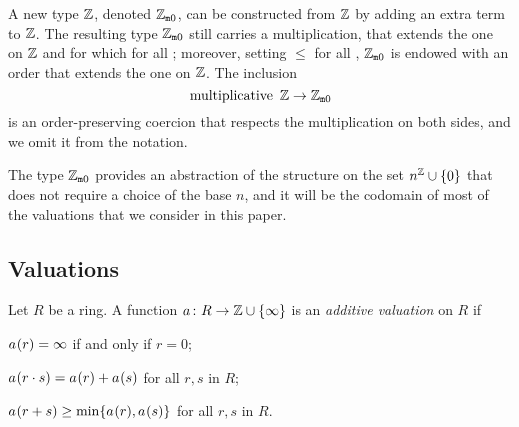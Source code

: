 \documentclass[sigplan,screen]{acmart}
\begin{document}
A new type  $\mathbb{Z}$\code{)}, denoted $\mathbb{Z}_{\mathtt{m}0}$, can be constructed from  $\mathbb{Z}$ by adding an extra term  to  $\mathbb{Z}$. The resulting type $\mathbb{Z}_{\mathtt{m}0}$ still carries a multiplication, that extends the one on  $\mathbb{Z}$ and for which  for all ; moreover, setting  $\le$  for all , $\mathbb{Z}_{\mathtt{m}0}$ is endowed with an order that extends the one on  $\mathbb{Z}$. The inclusion
\[
\text{\code{multiplicative} }\ZZ \rightarrow \wzmZZ
\]
is an order-preserving coercion that respects the multiplication on both sides, and we omit it from the notation.

The type $\mathbb{Z}_{\mathtt{m}0}$ provides an abstraction of the structure on the set $n^{\mathbb{Z}} \cup \{0\}$ that does not require a choice of the base $n$, and it will be the codomain of most of the valuations that we consider in this paper.

\subsection{Valuations}\label{subsection:valuations}
\begin{definition}\label{def:add_valuation}
Let $R$ be a ring. A function $\av \colon R \to \ZZ \cup \{\infty\}$ is an \emph{additive valuation} on $R$ if
\begin{listDef}
	\item $\av(r) = \infty$ if and only if $r = 0$; \label{def_add_valuation:zero}
	\item $\av (r\cdot s) = \av(r) + \av(s)$ for all $r, s$ in $R$;\label{def_add_valuation:mul}
	\item $\av (r + s) \geq \min \{\av(r), \av(s)\}$ for all $r, s$ in $R$. \label{def_add_valuation:add}
\end{listDef}
\end{definition}
\end{document}
